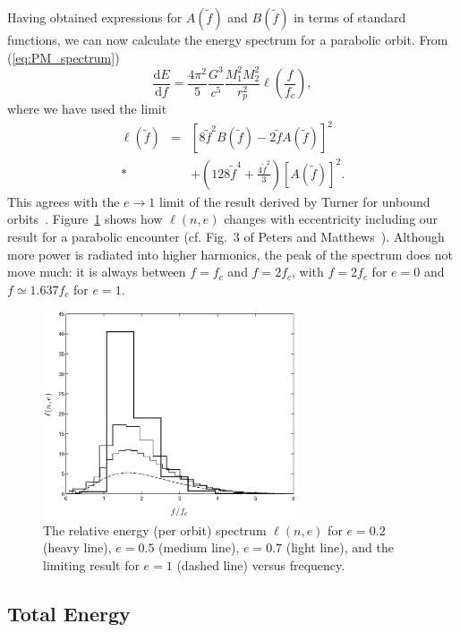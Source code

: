 \documentclass[aps,prd,amsfonts,amssymb,amsmath,nofootinbib,floatfix,reprint,showpacs,groupedaddress]{revtex4-1}
\newcommand{\eqnref}[1]{(\ref{eq:#1})}
\newcommand{\Figref}[1]{Figure~\ref{fig:#1}}
\newcommand{\sub}[1]{\ensuremath{_\text{#1}}}
\newcommand{\dd}{\ensuremath{\mathrm{d}}}
\newcommand{\diff}[2]{\ensuremath{\frac{\dd {#1}}{\dd {#2}}}}
\begin{document}
Having obtained expressions for $A(\tilde{f})$ and $B(\tilde{f})$ in terms of standard functions, we can now calculate the energy spectrum for a parabolic orbit. From \eqnref{PM_spectrum}
\begin{equation}
\diff{E}{f} = \frac{4\pi^2}{5}\frac{G^3}{c^5}\frac{M_1^2M_2^2}{r_{p}^2}\ell\left(\frac{f}{f\sub{c}}\right),
\label{eq:PM_dEdf}
\end{equation}
where we have used the limit
\begin{eqnarray}
\ell(\tilde{f}) & = & \left[8\tilde{f}^2B(\tilde{f}) - 2\tilde{f}A(\tilde{f})\right]^2 \nonumber \\*
 & & + \left(128\tilde{f}^4 + \frac{4\tilde{f}^2}{3}\right)\left[A(\tilde{f})\right]^2.
\end{eqnarray}
This agrees with the $e \rightarrow 1$ limit of the result derived by Turner for unbound orbits~\cite{Turner1977}. \Figref{ell} shows how $\ell(n,e)$ changes with eccentricity including our result for a parabolic encounter (cf. Fig.~3 of Peters and Matthews~\cite{Peters1963}). Although more power is radiated into higher harmonics, the peak of the spectrum does not move much: it is always between $f = f_{c}$ and $f = 2 f_{c}$, with $f = 2 f_{c}$ for $e = 0$ and $f \simeq 1.637 f_{c}$ for $e = 1$.
\begin{figure}
\includegraphics[width=75mm]{ell_1.eps}
\caption{The relative energy (per orbit) spectrum $\ell(n,e)$ for $e = 0.2$ (heavy line), $e = 0.5$ (medium line), $e = 0.7$ (light line), and the limiting result for $e = 1$ (dashed line) versus frequency.\label{fig:ell}}
\end{figure}

\subsection{Total Energy}
\end{document}
